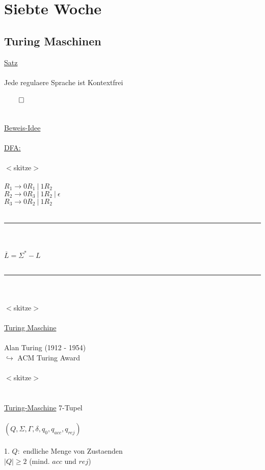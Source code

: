 \documentclass[18pt,a4paper]{scrreprt}
\newcommand{\tab}{\hspace*{2em}}
\begin{document}
\chapter{Siebte Woche}
\section{Turing Maschinen}

\uline{Satz}\\
\\
Jede regulaere Sprache ist Kontextfrei\\
\\
$\qed$\\
\\
\\
\uline{Beweis-Idee}\\
\\
\uline{DFA:}\\
\\
$<$skitze$>$\\
\\
$R_1 \rightarrow 0R_1 \:\vert\: 1R_2$\\ 
$R_2 \rightarrow 0R_3 \:\vert\: 1R_2 \:\vert\: \epsilon$\\
$R_3 \rightarrow 0R_2 \:\vert\: 1R_2$\\
\\
\rule{\textwidth}{0.4mm}\\
\\
$\overline{L} = \Sigma^* - L$\\
\\
\rule{\textwidth}{0.4mm}\\
\\
$<$skitze$>$\\
\\
\uline{Turing Maschine}\\
\\
Alan Turing (1912 - 1954)\\
$\hookrightarrow$ ACM Turing Award\\
\\
$<$skitze$>$\\
\\
\\
\uline{Turing-Maschine} 7-Tupel\\
\\
$(Q, \Sigma, \Gamma, \delta, q_0, q_{acc}, q_{rej})$\\
\\
1. $Q:$ endliche Menge von Zustaenden\\
\tab $|Q| \geq 2$ (mind. $acc$ und $rej$)\\
\end{document}

